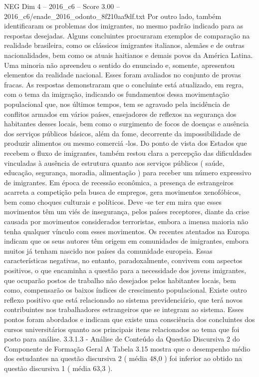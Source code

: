 \begin{textsample}{NEG Dim 4 – 2016\_c6 – Score 3.00 – 2016\_c6/enade\_2016\_odonto\_8f210aa9df.txt}
Por outro lado, também identificaram os problemas dos imigrantes, no mesmo padrão indicado para as respostas desejadas.
Alguns concluintes procuraram exemplos de comparação na realidade brasileira, como os clássicos imigrantes italianos, alemães e de outras nacionalidades, bem como os atuais haitianos e demais povos da América Latina.
Uma minoria não apreendeu o sentido do enunciado e, somente, apresentou elementos da realidade nacional.
Esses foram avaliados no conjunto de provas fracas.
As respostas demonstraram que o concluinte está atualizado, em regra, com o tema da imigração, indicando os fundamentos dessa movimentação populacional que, nos últimos tempos, tem se agravado pela incidência de conflitos armados em vários países, ensejadores de reflexos na segurança dos habitantes desses locais, bem como o surgimento de focos de doenças e ausência dos serviços públicos básicos, além da fome, decorrente da impossibilidade de produzir alimentos ou mesmo comerciá -los.
Do ponto de vista dos Estados que recebem o fluxo de imigrantes, também restou clara a percepção das dificuldades vinculadas à ausência de estrutura quanto aos serviços públicos ( saúde, educação, segurança, moradia, alimentação ) para receber um número expressivo de imigrantes.
Em época de recessão econômica, a presença de estrangeiros acarreta a competição pela busca de empregos, gera movimentos xenofóbicos, bem como choques culturais e políticos.
Deve -se ter em mira que esses movimentos têm um viés de insegurança, pelos países receptores, diante da crise causada por movimentos considerados terroristas, embora a imensa maioria não tenha qualquer vínculo com esses movimentos.
Os recentes atentados na Europa indicam que os seus autores têm origem em comunidades de imigrantes, embora muitos já tenham nascido nos países da comunidade europeia.
Essas características negativas, no entanto, paradoxalmente, convivem com aspectos positivos, o que encaminha a questão para a necessidade dos jovens imigrantes, que ocuparão postos de trabalho não desejados pelos habitantes locais, bem como, compensarão os baixos índices de crescimento populacional.
Existe outro reflexo positivo que está relacionado ao sistema previdenciário, que terá novos contribuintes nos trabalhadores estrangeiros que se integram ao sistema.
Esses pontos foram abordados e indicam que existe uma consciência dos concluintes dos cursos universitários quanto aos principais itens relacionados ao tema que foi posto para análise. 3.3.1.3 - Análise de Conteúdo da Questão Discursiva 2 do Componente de Formação Geral A Tabela 3.15 mostra que o desempenho médio dos estudantes na questão discursiva 2 ( média 48,0 ) foi inferior ao obtido na questão discursiva 1 ( média 63,3 ).

\end{textsample}
